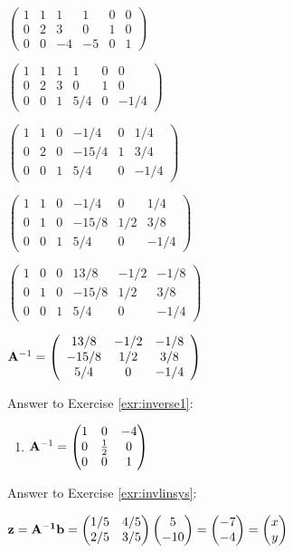\documentclass[
]{book}
\providecommand{\tightlist}{%
  \setlength{\itemsep}{0pt}\setlength{\parskip}{0pt}}
\theoremstyle{definition}
\theoremstyle{definition}
\theoremstyle{definition}
\theoremstyle{remark}
\begin{document}
\(\left(\begin{array}{ccc|ccc}  1&1&1 &1 &0&0\\  0&2&3 &0 &1&0\\  0&0&-4&-5&0&1 \end{array} \right)\)

\(\left(\begin{array}{ccc|ccc}  1&1&1&1 &0&0\\  0&2&3&0 &1&0\\  0&0&1&5/4&0&-1/4 \end{array} \right)\)

\(\left(\begin{array}{ccc|ccc}  1&1&0&-1/4 &0&1/4\\  0&2&0&-15/4&1&3/4\\  0&0&1&5/4 &0&-1/4 \end{array} \right)\)

\(\left(\begin{array}{ccc|ccc}  1&1&0&-1/4 &0 &1/4\\  0&1&0&-15/8&1/2&3/8\\  0&0&1&5/4 &0 &-1/4 \end{array} \right)\)

\(\left(\begin{array}{ccc|ccc}  1&0&0&13/8 &-1/2&-1/8\\  0&1&0&-15/8&1/2 &3/8\\  0&0&1&5/4 &0 &-1/4 \end{array} \right)\)

\({\bf A}^{-1} = \left(\begin{array}{ccc}  13/8 &-1/2&-1/8\\  -15/8&1/2 &3/8\\  5/4 &0 &-1/4 \end{array} \right)\)

Answer to Exercise \ref{exr:inverse1}:

\begin{enumerate}
\def\labelenumi{\arabic{enumi}.}
\tightlist
\item
  \({\bf A}^{-1}=\begin{pmatrix} 1&0&-4\\0&\frac{1}{2}&0\\0&0&1 \end{pmatrix}\)
\end{enumerate}

Answer to Exercise \ref{exr:invlinsys}:

\(\textbf{z} = \bf{A}^{-1} \bf{b} = \begin{pmatrix}  1/5 &4/5\\  2/5&3/5 \end{pmatrix} \begin{pmatrix}  5 \\  -10 \end{pmatrix}= \begin{pmatrix}  -7 \\  -4 \end{pmatrix} = \begin{pmatrix}  x \\  y \end{pmatrix}\)
\end{document}
